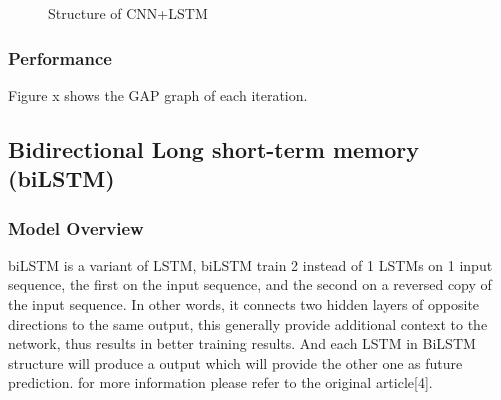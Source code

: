 \documentclass{article}
\begin{document}
\begin{figure}[h]
	\centering
	\caption{Structure of CNN+LSTM}
\end{figure} 

\subsubsection{Performance}
Figure x shows the GAP graph of each iteration.

\subsection{Bidirectional Long short-term memory (biLSTM)}
\subsubsection{Model Overview}
biLSTM is a variant of LSTM, biLSTM train 2 instead of 1 LSTMs on 1 input sequence, the first on the input sequence, and the second on a reversed copy of the input sequence. In other words, it connects two hidden layers of opposite directions to the same output, this generally provide additional context to the network, thus results in better training results. And each LSTM in BiLSTM structure will produce a output which will provide the other one as future prediction. for more information please refer to the original article[4]. 
\end{document}
